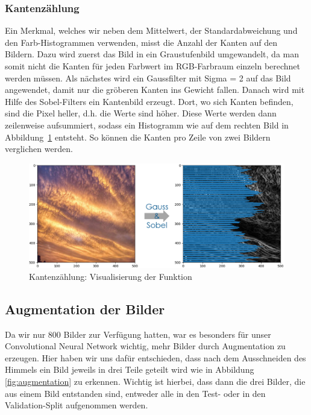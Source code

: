 \documentclass[a4,german]{article}
\begin{document}
\subsubsection{Kantenzählung}
\label{sec:kanten}
Ein Merkmal, welches wir neben dem Mittelwert, der Standardabweichung und den Farb-Histogrammen verwenden, misst die Anzahl der Kanten auf den Bildern.
Dazu wird zuerst das Bild in ein Graustufenbild umgewandelt, da man somit nicht die Kanten für jeden Farbwert im RGB-Farbraum einzeln berechnet werden müssen. Als nächstes wird ein Gaussfilter mit Sigma = 2 auf das Bild angewendet, damit nur die gröberen Kanten ins Gewicht fallen. Danach wird mit Hilfe des Sobel-Filters ein Kantenbild erzeugt.
Dort, wo sich Kanten befinden, sind die Pixel heller, d.h. die Werte sind höher.
Diese Werte werden dann zeilenweise aufsummiert, sodass ein Histogramm wie auf dem rechten Bild in Abbildung~\ref{fig:kaz} entsteht. So können die Kanten pro Zeile von zwei Bildern verglichen werden.

\begin{figure}[h!]
\centering
\includegraphics[width=\textwidth]{Kantenzaehlung.png}
\caption{Kantenzählung: Visualisierung der Funktion}
    \label{fig:kaz}
\end{figure}

\subsection{Augmentation der Bilder}
\label{sec:augmentation}
Da wir nur 800 Bilder zur Verfügung hatten, war es besonders für unser Convolutional Neural Network wichtig, mehr Bilder durch Augmentation zu erzeugen.
Hier haben wir uns dafür entschieden, dass nach dem Ausschneiden des Himmels%
ein Bild jeweils in drei Teile geteilt wird wie in Abbildung \ref{fig:augmentation} zu erkennen.
Wichtig ist hierbei, dass dann die drei Bilder, die aus einem Bild entstanden sind, entweder alle in den Test- oder in den Validation-Split aufgenommen werden.
\end{document}

